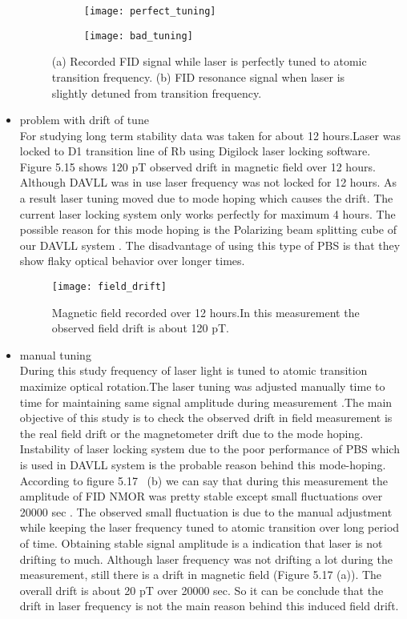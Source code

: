 \documentclass[12pt]{report}
\begin{document}
\begin{itemize}
\begin{figure}
    \begin{subfigure}[b]{0.45\textwidth}
        \centering
        \texttt{[image: perfect\_tuning]}
        \caption{}
        \label{fig:three sin x}
    \end{subfigure}
    \hfill
    \begin{subfigure}[b]{0.45\textwidth}
        \centering
        \texttt{[image: bad\_tuning]}
        \caption{}
        \label{fig:five over x}
    \end{subfigure}
    \caption{(a) Recorded FID signal while laser is perfectly tuned to atomic transition frequency. (b) FID resonance signal when laser is slightly detuned from transition frequency.}
    \label{fig:three graphs}
\end{figure}
   \item problem with drift of tune\\
   For studying long term stability data was taken for about 12 hours.Laser was locked to D1 transition line of Rb using Digilock laser locking software. Figure 5.15 shows 120 pT observed drift in magnetic field over 12 hours. Although DAVLL was in use laser frequency was not locked for 12 hours. As a result laser tuning moved due to mode hoping which causes the drift. The current laser locking system only works perfectly for maximum 4 hours. The possible reason for this mode hoping is the Polarizing beam splitting cube of our DAVLL system \cite{principles}. The disadvantage of using this type of PBS is that they show flaky optical behavior over longer times.
   \begin{figure}[h]
\centering\texttt{[image: field\_drift]}
\caption{Magnetic field recorded over 12 hours.In this measurement the observed field drift is about 120 pT.}
\end{figure}
\item manual tuning\\
   During this study frequency of laser light is tuned to atomic transition maximize optical rotation.The laser tuning was adjusted manually time to time for maintaining same signal amplitude during measurement .The main objective of this study is to check the observed drift in field measurement is the real field drift or the magnetometer drift due to the mode hoping. Instability of laser locking system due to the poor performance of PBS which is used in DAVLL system is the probable reason behind this mode-hoping. According to figure 5.17~ (b) we can say that during this measurement the amplitude of FID NMOR was pretty stable except small fluctuations over 20000 sec . The observed small fluctuation is due to the manual adjustment while keeping the laser frequency tuned to atomic transition over long period of time. Obtaining stable signal amplitude is a indication that laser is not drifting to much. Although laser frequency was not drifting a lot during  the measurement, still there is a  drift in magnetic field (Figure 5.17 (a)). The overall drift is about 20 pT over 20000 sec. So it can be conclude that the drift in laser frequency is not the main reason behind this induced field drift. 
   
    
   \end{itemize}
\end{document}
